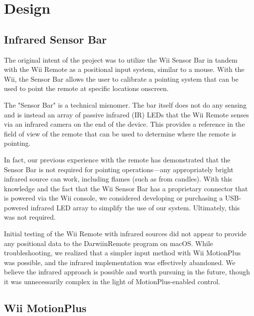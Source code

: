 \documentclass[conf]{new-aiaa}
\begin{document}
\section{Design}

    \subsection{Infrared Sensor Bar}
        
        The original intent of the project was to utilize the Wii Sensor Bar in tandem with the Wii Remote as a positional input system, similar to a mouse. With the Wii, the Sensor Bar allows the user to calibrate a pointing system that can be used to point the remote at specific locations onscreen.
        
        The "Sensor Bar" is a technical misnomer. The bar itself does not do any sensing and is instead an array of passive infrared (IR) LEDs that the Wii Remote senses via an infrared camera on the end of the device. This provides a reference in the field of view of the remote that can be used to determine where the remote is pointing.
        
        In fact, our previous experience with the remote has demonstrated that the Sensor Bar is not required for pointing operations---any appropriately bright infrared source can work, including flames (such as from candles). With this knowledge and the fact that the Wii Sensor Bar has a proprietary connector that is powered via the Wii console, we considered developing or purchasing a USB-powered infrared LED array to simplify the use of our system. Ultimately, this was not required.
        
        Initial testing of the Wii Remote with infrared sources did not appear to provide any positional data to the DarwiinRemote program on macOS. While troubleshooting, we realized that a simpler input method with Wii MotionPlus was possible, and the infrared implementation was effectively abandoned. We believe the infrared approach is possible and worth pursuing in the future, though it was unnecessarily complex in the light of MotionPlus-enabled control. 
    
    \subsection{Wii MotionPlus} %
    
\end{document}
